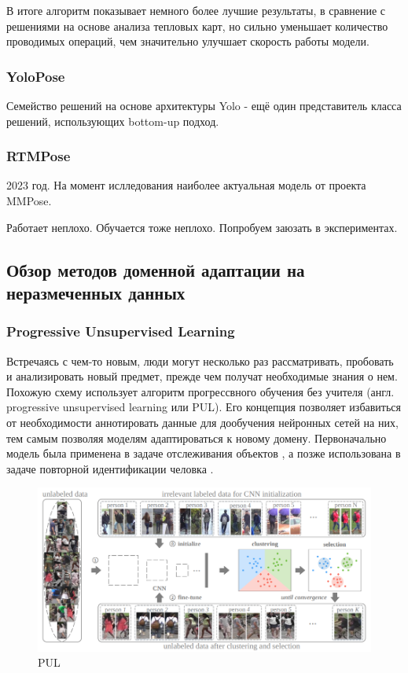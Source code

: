 В итоге алгоритм показывает немного более лучшие результаты, в сравнение с решениями на основе анализа тепловых карт, но сильно уменьшает количество проводимых операций, чем значительно улучшает скорость работы модели.

\subsubsection*{YoloPose}

Семейство решений на основе архитектуры Yolo - ещё один представитель класса решений, использующих bottom-up подход. 

\subsubsection*{RTMPose}

2023 год. На момент ислледования наиболее актуальная модель от проекта MMPose.

Работает неплохо. Обучается тоже неплохо. Попробуем заюзать в экспериментах.


\subsection{Обзор методов доменной адаптации на неразмеченных данных}
\label{sec:Chapter4_DA}


\subsubsection*{Progressive Unsupervised Learning}

Встречаясь с чем-то новым, люди могут несколько раз рассматривать, пробовать и анализировать новый предмет, прежде чем получат необходимые знания о нем. Похожую схему использует алгоритм прогрессвного обучения без учителя (англ. progressive unsupervised learning или PUL). Его концепция позволяет избавиться от необходимости аннотировать данные для дообучения нейронных сетей на них, тем самым позволяя моделям адаптироваться к новому домену. Первоначально модель была применена в задаче отслеживания объектов \cite{pul}, а позже использована в задаче повторной идентификации человка \cite{pul_person}.

\begin{figure}[h]
	\centering
	\includegraphics[width=.8\textwidth]{./images/pul}
	\caption{PUL \cite{pul_person}}
	\label{fig:pul}
\end{figure}

